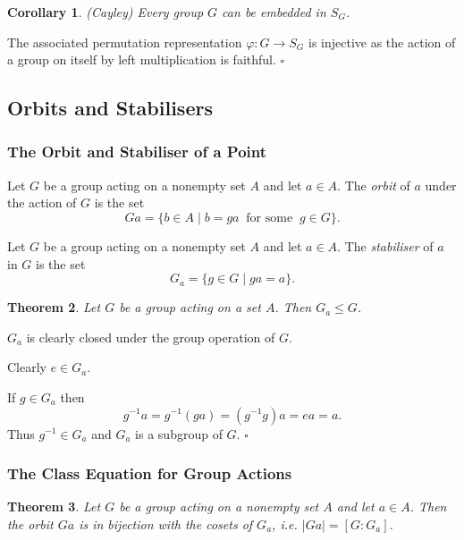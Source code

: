 \documentclass[10pt]{article}
\newtheorem{theorem}{Theorem}[section]
\newtheorem{corollary}[theorem]{Corollary}
\newenvironment{proof}[1][Proof]{\begin{trivlist}
\item[\hskip \labelsep {\itshape #1}]}{\end{trivlist}}
\newenvironment{definition}[1][Definition]{\begin{trivlist}
\item[\hskip \labelsep {\bfseries #1}]}{\end{trivlist}}
\begin{document}
\begin{corollary} (Cayley)
Every group $G$ can be embedded in $S_G$.
\end{corollary}

\begin{proof}
The associated permutation representation $\varphi : G \to S_G$ is injective as the action of a group on itself by left multiplication is faithful. $\square$
\end{proof}

\subsection{Orbits and Stabilisers}

\subsubsection{The Orbit and Stabiliser of a Point}

\begin{definition}
Let $G$ be a group acting on a nonempty set $A$ and let $a \in A$. The \emph{orbit} of $a$ under the action of $G$ is the set
$$Ga = \{b \in A \;|\; b = ga \;\;\mbox{for some}\;\; g \in G\}.$$
\end{definition}

\begin{definition}
Let $G$ be a group acting on a nonempty set $A$ and let $a \in A$. The \emph{stabiliser} of $a$ in $G$ is the set
$$G_a = \{g \in G \;|\; ga = a\}.$$
\end{definition}

\begin{theorem}
Let $G$ be a group acting on a set $A$. Then $G_a \leq G$.
\end{theorem}

\begin{proof}
$G_a$ is clearly closed under the group operation of $G$.

Clearly $e \in G_a$.

If $g \in G_a$ then
$$g^{-1}a = g^{-1}(ga) = (g^{-1}g)a = ea = a.$$
Thus $g^{-1} \in G_a$ and $G_a$ is a subgroup of $G$. $\square$
\end{proof}

\subsubsection{The Class Equation for Group Actions}

\begin{theorem}
Let $G$ be a group acting on a nonempty set $A$ and let $a \in A$. Then the orbit $Ga$ is in bijection with the cosets of $G_a$, i.e. $|Ga| = [G:G_a]$.
\end{theorem}
\end{document}

